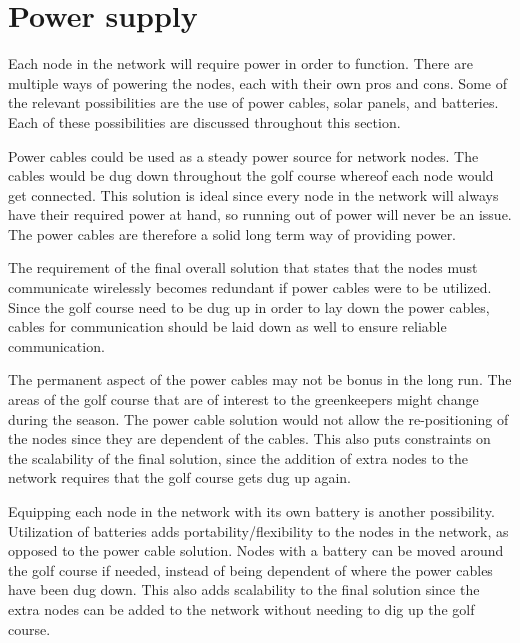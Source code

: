 \section{Power supply}
%


Each node in the network will require power in order to function. 
There are multiple ways of powering the nodes, each with their own pros and cons. 
Some of the relevant possibilities are the use of power cables, solar panels, and batteries. 
Each of these possibilities are discussed throughout this section.


Power cables could be used as a steady power source for network nodes. 
The cables would be dug down throughout the golf course whereof each node would get connected. 
This solution is ideal since every node in the network will always have their required power at hand, so running out of power will never be an issue. 
The power cables are therefore a solid long term way of providing power.

The requirement of the final overall solution that states that the nodes must communicate wirelessly becomes redundant if power cables were to be utilized. 
Since the golf course need to be dug up in order to lay down the power cables, cables for communication should be laid down as well to ensure reliable communication.

The permanent aspect of the power cables may not be bonus in the long run. 
The areas of the golf course that are of interest to the greenkeepers might change during the season. 
The power cable solution would not allow the re-positioning of the nodes since they are dependent of the cables. 
This also puts constraints on the scalability of the final solution, since the addition of extra nodes to the network requires that the golf course gets dug up again.

Equipping each node in the network with its own battery is another possibility. 
Utilization of batteries adds portability/flexibility to the nodes in the network, as opposed to the power cable solution. 
Nodes with a battery can be moved around the golf course if needed, instead of being dependent of where the power cables have been dug down. 
This also adds scalability to the final solution since the extra nodes can be added to the network without needing to dig up the golf course.

